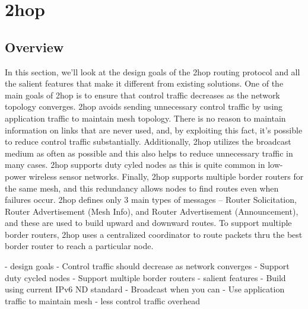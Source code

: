 \section{2hop}

\subsection{Overview}
In this section, we'll look at the design goals of the 2hop routing protocol and all the salient features that make it different from existing solutions. 
One of the main goals of 2hop is to ensure that control traffic decreases as the network topology converges. 
2hop avoids sending unnecessary control traffic by using application traffic to maintain mesh topology. 
There is no reason to maintain information on links that are never used, and, by exploiting this fact, it's possible to reduce control traffic substantially. 
Additionally, 2hop utilizes the broadcast medium as often as possible and this also helps to reduce unnecessary traffic in many cases.
2hop supports duty cyled nodes as this is quite common in low-power wireless sensor networks.
Finally, 2hop supports multiple border routers for the same mesh, and this redundancy allows nodes to find routes even when failures occur.
2hop defines only 3 main types of messages -- Router Solicitation, Router Advertisement (Mesh Info), and Router Advertisement (Announcement), and these are used to build upward and downward routes.
To support multiple border routers, 2hop uses a centralized coordinator to route packets thru the best border router to reach a particular node.

- design goals
    - Control traffic should decrease as network converges
    - Support duty cycled nodes
    - Support multiple border routers
- salient features
    - Build using current IPv6 ND standard
    - Broadcast when you can
    - Use application traffic to maintain mesh
    - less control traffic overhead
\fi

